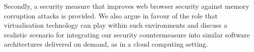 
Secondly, a security measure that improves web browser security against memory corruption attacks is provided. We also argue in favour of the role that virtualisation technology can play within such environments and discuss a realistic scenario for integrating our security countermeasure into similar software architectures delivered on demand, as in a cloud computing setting.

